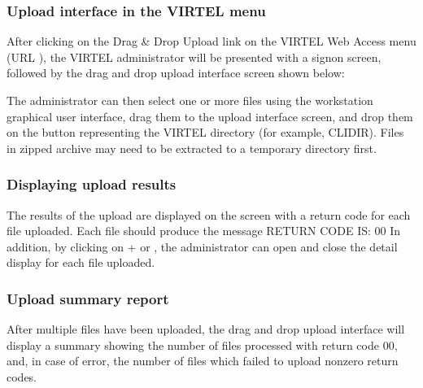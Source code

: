 \documentclass[letterpaper,10pt,english]{sphinxmanual}
\begin{document}
\subsubsection{Upload interface in the VIRTEL menu}
\label{\detokenize{audit_operations_ and_performance:upload-interface-in-the-virtel-menu}}
\sphinxAtStartPar
After clicking on the Drag \& Drop Upload link on the VIRTEL Web Access menu (URL ), the VIRTEL administrator will be presented with a signon screen, followed by the drag and drop upload interface screen shown below:

\sphinxAtStartPar
{}

\sphinxAtStartPar
{}

\sphinxAtStartPar
The administrator can then select one or more files using the workstation graphical user interface, drag them to the upload interface screen, and drop them on the button representing the VIRTEL directory (for example, CLI\sphinxhyphen{}DIR). Files in zipped archive may need to be extracted to a temporary directory first.


\subsubsection{Displaying upload results}
\label{\detokenize{audit_operations_ and_performance:displaying-upload-results}}
\sphinxAtStartPar
{}

\sphinxAtStartPar
{}

\sphinxAtStartPar
The results of the upload are displayed on the screen with a return code for each file uploaded. Each file should produce the message RETURN CODE IS: 00 In addition, by clicking on + or \sphinxhyphen{}, the administrator can open and close the detail display for each file uploaded.


\subsubsection{Upload summary report}
\label{\detokenize{audit_operations_ and_performance:upload-summary-report}}
\sphinxAtStartPar
After multiple files have been uploaded, the drag and drop upload interface will display a summary showing the number of files processed with return code 00, and, in case of error, the number of files which failed to upload nonzero return codes.
\end{document}
